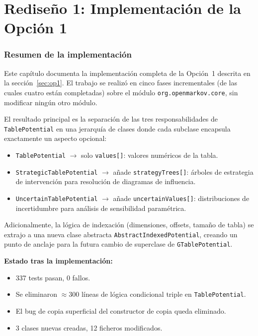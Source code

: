 \documentclass[11pt,a4paper]{article}
\newcommand{\code}[1]{\texttt{#1}}
\begin{document}
\part{Rediseño 1: Implementación de la Opción 1}
\label{part:rediseno1}

\section{Resumen de la implementación}
\label{sec:resumen-impl}

Este capítulo documenta la implementación completa de la Opción~1 descrita
en la sección~\ref{sec:op1}.  El trabajo se realizó en cinco fases incrementales
(de las cuales cuatro están completadas) sobre el módulo
\code{org.openmarkov.core}, sin modificar ningún otro módulo.

El resultado principal es la separación de las tres responsabilidades de
\code{TablePotential} en una jerarquía de clases donde cada subclase encapsula
exactamente un aspecto opcional:

\begin{itemize}
  \item \code{TablePotential} $\to$ solo \code{values[]}: valores numéricos de la
        tabla.
  \item \code{StrategicTablePotential} $\to$ añade \code{strategyTrees[]}: árboles
        de estrategia de intervención para resolución de diagramas de influencia.
  \item \code{UncertainTablePotential} $\to$ añade \code{uncertainValues[]}: distribuciones
        de incertidumbre para análisis de sensibilidad paramétrica.
\end{itemize}

Adicionalmente, la lógica de indexación (dimensiones, offsets, tamaño de tabla)
se extrajo a una nueva clase abstracta \code{AbstractIndexedPotential}, creando un
punto de anclaje para la futura cambio de superclase de \code{GTablePotential}.

\noindent\textbf{Estado tras la implementación:}
\begin{itemize}
  \item 337 tests pasan, 0 fallos.
  \item Se eliminaron $\approx$300 líneas de lógica condicional triple en
        \code{TablePotential}.
  \item El bug de copia superficial del constructor de copia queda eliminado.
  \item 3 clases nuevas creadas, 12 ficheros modificados.
\end{itemize}
\end{document}
